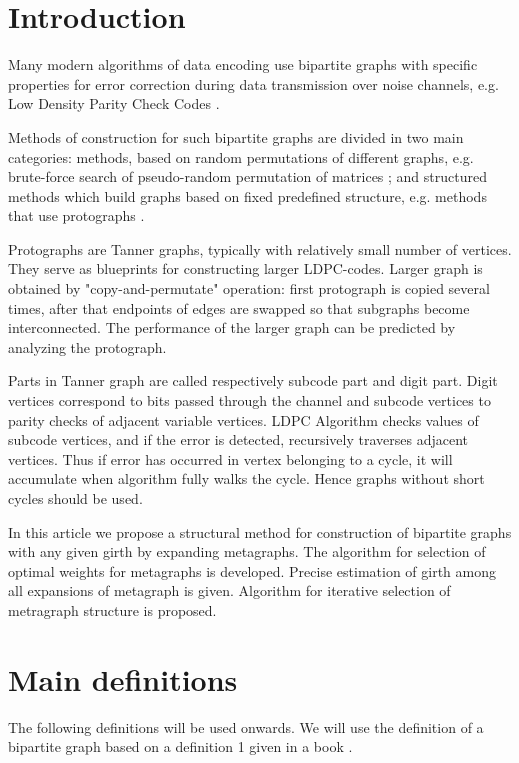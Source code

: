 \documentclass[a4paper,fleqn]{cas-sc}
\newcounter{definition}[section]
\begin{document}
\renewcommand{\mod}[1]{\textrm{mod}\ #1}

\section{Introduction}

Many modern algorithms of data encoding use bipartite graphs with specific properties for error correction during data transmission over noise channels, e.g. Low Density Parity Check Codes \cite{LDPC}. 

Methods of construction for such bipartite graphs are divided in two main categories: methods, based on random permutations of different graphs, e.g. brute-force search \cite{bruteforce} of pseudo-random permutation of matrices \cite{gallager}; and structured methods which build graphs based on fixed predefined structure, e.g. methods that use protographs \cite{protographs}.

Protographs are Tanner graphs, typically with relatively small number of vertices. They serve as blueprints for constructing larger LDPC-codes. Larger graph is obtained by "copy-and-permutate" operation: first protograph is copied several times, after that endpoints of edges are swapped so that subgraphs become interconnected. The performance of the larger graph can be predicted by analyzing the protograph. 

Parts in Tanner graph are called respectively subcode part and digit part. Digit vertices correspond to bits passed through the channel and subcode vertices to parity checks of adjacent variable vertices. LDPC Algorithm checks values of subcode vertices, and if the error is detected, recursively traverses adjacent vertices. Thus if error has occurred in vertex belonging to a cycle, it will accumulate when algorithm fully walks the cycle. Hence graphs without short cycles should be used.

In this article we propose a structural method for construction of bipartite graphs with any given girth by expanding metagraphs. The algorithm for selection of optimal weights for metagraphs is developed. Precise estimation of girth among all expansions of metagraph is given. Algorithm for iterative selection of metragraph structure is proposed.

\section{Main definitions}

The following definitions will be used onwards. We will use the definition of a bipartite graph based on a definition 1 given in a book \cite{tutte_graph_definition}.
\end{document}
